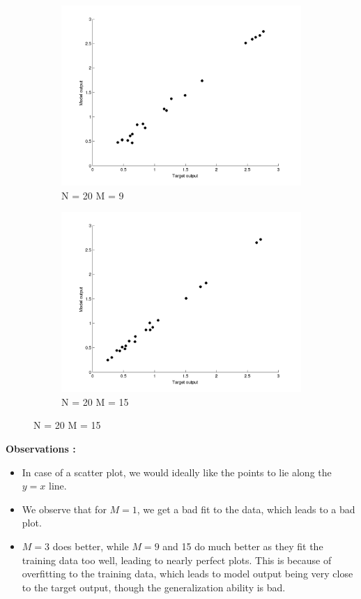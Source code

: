 \documentclass{article}
\begin{document}
\begin{figure}[H]
\begin{subfigure}{.5\textwidth}
\centering
\includegraphics[width=\linewidth]{Scatter_1/VaryingM_N20M9}
\caption{N = 20 M = 9}
\end{subfigure}
\begin{subfigure}{.5\textwidth}
\includegraphics[width=\linewidth]{Scatter_1/VaryingM_N20M15}
\caption{N = 20 M = 15}
\end{subfigure}


\end{figure}

\textbf{Observations : \newline}
\begin{itemize}
\item In case of a scatter plot, we would ideally like the points to lie along the $y = x$ line. 
\item We observe that for $M=1$, we get a bad fit to the data, which leads to a bad plot.
\item $M = 3$ does better, while $M=9$ and 15 do much better as they fit the training data too well, leading to nearly perfect plots. This is because of overfitting to the training data, which leads to model output being very close to the target output, though the generalization ability is bad.

\end{itemize}
\end{document}
